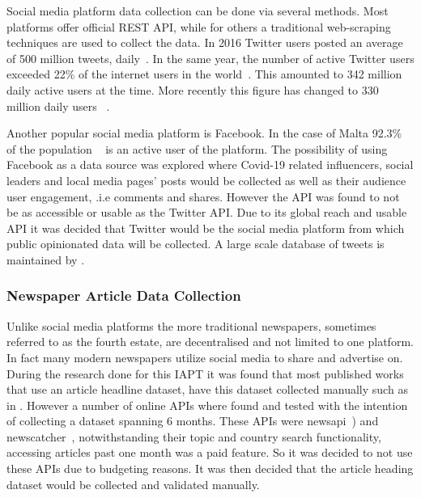 Social media platform data collection can be done via several methods.
Most platforms offer official \ac{REST} \ac{API}, while for others a traditional web-scraping techniques are used to collect the data.
In 2016 Twitter users posted an average of 500 million tweets, daily~\citep{Crannell2016}.
In the same year, the number of active Twitter users exceeded 22\% of the internet users in the world~\citep{Kayser2016}.
This amounted to 342 million daily active users at the time.
More recently this figure has changed to 330 million daily users ~\citep{tankovska_2021}.

Another popular social media platform is Facebook.
In the case of Malta 92.3\% of the population ~\citep{napoleoncat} is an active user of the platform.
The possibility of using Facebook as a data source was explored where Covid-19 related influencers, social leaders and local media pages' posts would be collected as well as their audience user engagement, .i.e comments and shares.
However the \ac{API} was found to not be as accessible or usable as the Twitter \ac{API}.
Due to its global reach and usable \ac{API} it was decided that Twitter would be the social media platform from which public opinionated data will be collected.
A large scale database of tweets is maintained by \citet{banda2020largescale}.

\subsubsection{Newspaper Article Data Collection}

Unlike social media platforms the more traditional newspapers, sometimes referred to as the fourth estate, are decentralised and not limited to one platform.
In fact many modern newspapers utilize social media to share and advertise on.
During the research done for this \ac{IAPT} it was found that most published works that use an article headline dataset, have this dataset collected manually such as in \citet{newspaper_headlines}.
However a number of online \ac{API}s where found and tested with the intention of collecting a dataset spanning 6 months.
These \ac{API}s were newsapi~\citep{newsapi}) and newscatcher~\citep{newscatcher}, notwithstanding their topic and country search functionality, accessing articles past one month was a paid feature.
So it was decided to not use these \ac{API}s due to budgeting reasons.
It was then decided that the article heading dataset would be collected and validated manually.

